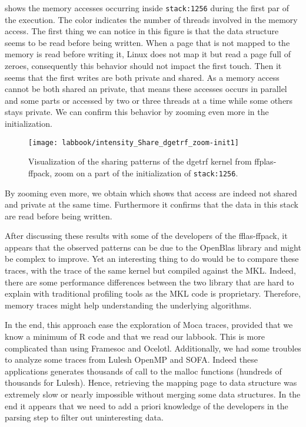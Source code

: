  shows the memory accesses occurring inside \texttt{stack:1256} during the first par of the execution.
The color indicates the number of threads involved in the memory access.
The first thing we can notice in this figure is that the data structure seems to be read before being written.
When a page that is not mapped to the memory is read before writing it, \gls{Linux} does not map it but read a page full of zeroes, consequently this behavior should not impact the first touch.
Then it seems that the first writes are both private and shared.
As a memory access cannot be both shared an private, that means these accesses occurs in parallel and some parts or accessed by two or three threads at a time while some others stays private.
We can confirm this behavior by zooming even more in the initialization.

\begin{figure}[htb]
    \centering
    \texttt{[image: labbook/intensity\_Share\_dgetrf\_zoom-init1]}
    \caption{Visualization of the sharing patterns of the dgetrf kernel from ffplas-ffpack, zoom on a part of the initialization of \texttt{stack:1256}.}
    \label{fig:dgetrf-share-zoom-init1}
\end{figure}

By zooming even more, we obtain  which shows that access are indeed not shared and private at the same time.
Furthermore it confirms that the data in this stack are read before being written.

After discussing these results with some of the developers of the fflas-ffpack, it appears that the observed patterns can be due to the OpenBlas library and might be complex to improve.
Yet an interesting thing to do would be to compare these traces, with the trace of the same kernel but compiled against the \gls{MKL}.
Indeed, there are some performance differences between the two library that are hard to explain with traditional profiling tools as the \gls{MKL} code is proprietary.
Therefore, memory traces might help understanding the underlying algorithms.

In the end, this approach ease the exploration of \gls{Moca} traces, provided that we know a minimum of \gls{R} code and that we read our labbook.
This is more complicated than using \gls{Framesoc} and \gls{Ocelotl}.
Additionally, we had some troubles to analyze some traces from Lulesh \gls{OpenMP} and \gls{SOFA}.
Indeed these applications generates thousands of call to the malloc functions (hundreds of thousands for Lulesh).
Hence, retrieving the mapping page to data structure was extremely slow or nearly impossible without merging some data structures.
In the end it appears that we need to add a priori knowledge of the developers in the parsing step to filter out uninteresting data.

